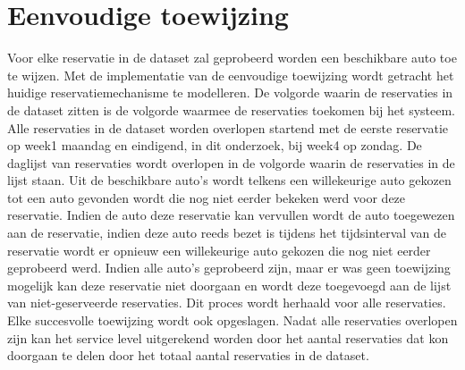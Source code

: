 \section{Eenvoudige toewijzing} \label{eenvoudige-toewijzing}
Voor elke reservatie in de dataset zal geprobeerd worden een beschikbare auto toe te wijzen. Met de implementatie van de eenvoudige toewijzing wordt getracht het huidige reservatiemechanisme te modelleren. De volgorde waarin de reservaties in de dataset zitten is de volgorde waarmee de reservaties toekomen bij het systeem. Alle reservaties in de dataset worden overlopen startend met de eerste reservatie op week1 maandag en eindigend, in dit onderzoek, bij week4 op zondag. De daglijst van reservaties wordt overlopen in de volgorde waarin de reservaties in de lijst staan. Uit de beschikbare auto's wordt telkens een willekeurige auto gekozen tot een auto gevonden wordt die nog niet eerder bekeken werd voor deze reservatie. Indien de auto deze reservatie kan vervullen wordt de auto toegewezen aan de reservatie, indien deze auto reeds bezet is tijdens het tijdsinterval van de reservatie wordt er opnieuw een willekeurige auto gekozen die nog niet eerder geprobeerd werd. Indien alle auto's geprobeerd zijn, maar er was geen toewijzing mogelijk kan deze reservatie niet doorgaan en wordt deze toegevoegd aan de lijst van niet-geserveerde reservaties. Dit proces wordt herhaald voor alle reservaties. Elke succesvolle toewijzing wordt ook opgeslagen. Nadat alle reservaties overlopen zijn kan het service level uitgerekend worden door het aantal reservaties dat kon doorgaan te delen door het totaal aantal reservaties in de dataset. 
